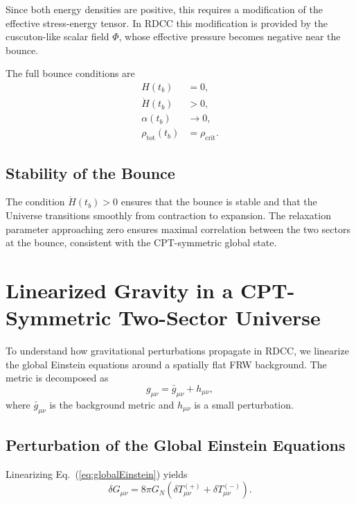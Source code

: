 \documentclass[11pt,a4paper]{article}
\begin{document}
Since both energy densities are positive, this requires a modification of the effective stress-energy tensor. In RDCC this modification is provided by the cuscuton-like scalar field $\Phi$, whose effective pressure becomes negative near the bounce.

The full bounce conditions are
\begin{align}
H(t_b) &= 0, \\
\dot{H}(t_b) &> 0, \\
\alpha(t_b) &\to 0, \\
\rho_{\mathrm{tot}}(t_b) &= \rho_{\mathrm{crit}}.
\end{align}

\subsection{Stability of the Bounce}

The condition $\dot{H}(t_b) > 0$ ensures that the bounce is stable and that the Universe transitions smoothly from contraction to expansion. The relaxation parameter approaching zero ensures maximal correlation between the two sectors at the bounce, consistent with the CPT-symmetric global state.
\section{Linearized Gravity in a CPT-Symmetric Two-Sector Universe}

To understand how gravitational perturbations propagate in RDCC, we linearize the global Einstein equations around a spatially flat FRW background. The metric is decomposed as
\begin{equation}
g_{\mu\nu} = \bar{g}_{\mu\nu} + h_{\mu\nu},
\end{equation}
where $\bar{g}_{\mu\nu}$ is the background metric and $h_{\mu\nu}$ is a small perturbation.

\subsection{Perturbation of the Global Einstein Equations}

Linearizing Eq.~(\ref{eq:globalEinstein}) yields
\begin{equation}
\delta G_{\mu\nu} = 8\pi G_N \left( \delta T_{\mu\nu}^{(+)} + \delta T_{\mu\nu}^{(-)} \right).
\label{eq:linEinstein}
\end{equation}
\end{document}
